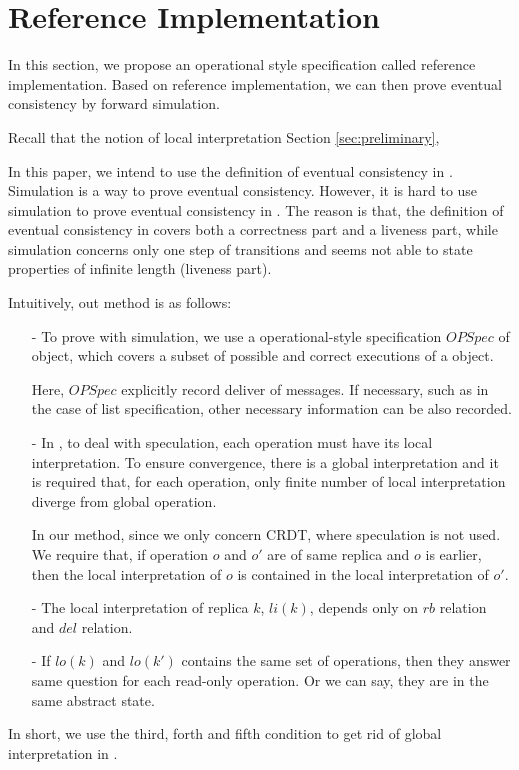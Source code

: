 
\section{Reference Implementation}
\label{sec:reference implementation} 

In this section, we propose an operational style specification called reference implementation. Based on reference implementation, we can then prove eventual consistency by forward simulation. 

Recall that the notion of local interpretation Section \ref{sec:preliminary}, 





In this paper, we intend to use the definition of eventual consistency in \cite{Bouajjani:2014}. Simulation is a way to prove eventual consistency. However, it is hard to use simulation to prove eventual consistency in \cite{Bouajjani:2014}. The reason is that, the definition of eventual consistency in \cite{Bouajjani:2014} covers both a correctness part and a liveness part, while simulation concerns only one step of transitions and seems not able to state properties of infinite length (liveness part).

Intuitively, out method is as follows:

\begin{itemize}
\setlength{\itemsep}{0.5pt}
\item[-] To prove with simulation, we use a operational-style specification $\textit{OPSpec}$ of object, which covers a subset of possible and correct executions of a object.

Here, $\textit{OPSpec}$ explicitly record deliver of messages. If necessary, such as in the case of list specification, other necessary information can be also recorded.

\item[-] In \cite{Bouajjani:2014}, to deal with speculation, each operation must have its local interpretation. To ensure convergence, there is a global interpretation and it is required that, for each operation, only finite number of local interpretation diverge from global operation.

    In our method, since we only concern CRDT, where speculation is not used. We require that, if operation $o$ and $o'$ are of same replica and $o$ is earlier, then the local interpretation of $o$ is contained in the local interpretation of $o'$.

\item[-] The local interpretation of replica $k$, $li(k)$, depends only on $rb$ relation and $del$ relation.

\item[-] If $lo(k)$ and $lo(k')$ contains the same set of operations, then they answer same question for each read-only operation. Or we can say, they are in the same abstract state.
\end{itemize}

In short, we use the third, forth and fifth condition to get rid of global interpretation in \cite{Bouajjani:2014}.



